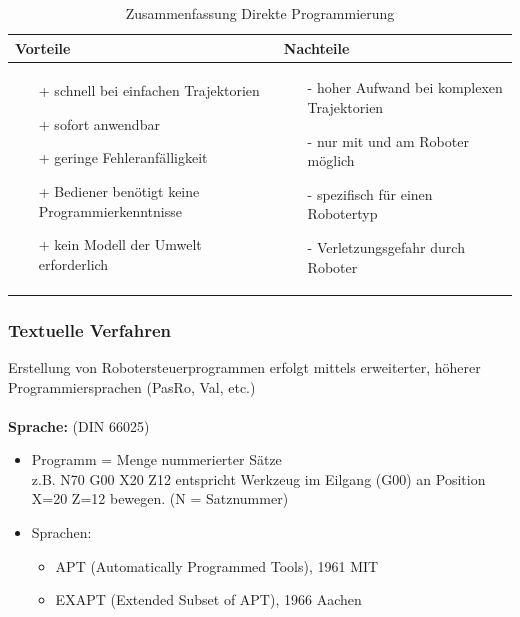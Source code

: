 \begin{table}[hbt]
\centering
\begin{tabular}{|p{7.5cm}|p{7.5cm}|}
\hline
Vorteile & Nachteile\\
\hline
\vspace{-5mm}
\begin{itemize}
\setlength\itemsep{0em}
\item[+] schnell bei einfachen Trajektorien
\item[+] sofort anwendbar
\item[+] geringe Fehleranfälligkeit
\item[+] Bediener benötigt keine Programmierkenntnisse
\item[+] kein Modell der Umwelt erforderlich
\end{itemize}
 &
 \vspace{-5mm}
\begin{itemize}
\setlength\itemsep{0em}
\item[-] hoher Aufwand bei komplexen Trajektorien
\item[-] nur mit und am Roboter möglich
\item[-] spezifisch für einen Robotertyp
\item[-] Verletzungsgefahr durch Roboter
\end{itemize}\\
\hline
\end{tabular}
\caption{Zusammenfassung Direkte Programmierung}
\label{tab:dirprog}
\end{table}
\subsubsection{Textuelle Verfahren}
Erstellung von Robotersteuerprogrammen erfolgt mittels erweiterter,
höherer Programmiersprachen (PasRo, Val, etc.)
\\ \\
\textbf{Sprache:} (DIN 66025)
\begin{itemize}
\item Programm = Menge nummerierter Sätze\\
z.B. \glqq N70 G00 X20 Z12\grqq{} entspricht Werkzeug im Eilgang (G00) an Position X=20 Z=12 bewegen. (N = Satznummer)
\item Sprachen:
\begin{itemize}
\item APT (Automatically Programmed Tools), 1961 MIT
\item EXAPT (Extended Subset of APT), 1966 Aachen
\end{itemize}
\end{itemize}

